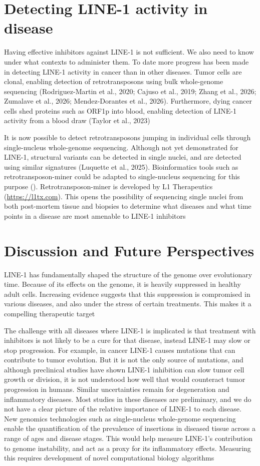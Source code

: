\documentclass[11pt,twocolumn,twoside]{extarticle}
\begin{document}
\section{Detecting LINE-1 activity in disease}
Having effective inhibitors against LINE-1 is not sufficient. We also need to know under what contexts to administer them. To date more progress has been made in detecting LINE-1 activity in cancer than in other diseases. Tumor cells are clonal, enabling detection of retrotransposons using bulk whole-genome sequencing (Rodriguez-Martin et al., 2020; Cajuso et al., 2019; Zhang et al., 2026; Zumalave et al., 2026; Mendez-Dorantes et al., 2026). Furthermore, dying cancer cells shed proteins such as ORF1p into blood, enabling detection of LINE-1 activity from a blood draw (Taylor et al., 2023)

It is now possible to detect retrotransposons jumping in individual cells through single-nucleus whole-genome sequencing. Although not yet demonstrated for LINE-1, structural variants can be detected in single nuclei, and are detected using similar signatures (Luquette et al., 2025). Bioinformatics tools such as retrotransposon-miner could be adapted to single-nucleus sequencing for this purpose (\href{https://github.com/L1-Therapeutics/retrotransposon-miner}{\faGithub}). Retrotransposon-miner is developed by L1 Therapeutics (\url{https://l1tx.com}). This opens the possibility of sequencing single nuclei from both post-mortem tissue and biopsies to determine what diseases and what time points in a disease are most amenable to LINE-1 inhibitors

\section{Discussion and Future Perspectives}
LINE-1 has fundamentally shaped the structure of the genome over evolutionary time. Because of its effects on the genome, it is heavily suppressed in healthy adult cells. Increasing evidence suggests that this suppression is compromised in various diseases, and also under the stress of certain treatments. This makes it a compelling therapeutic target

The challenge with all diseases where LINE-1 is implicated is that treatment with inhibitors is not likely to be a cure for that disease, instead LINE-1 may slow or stop progression. For example, in cancer LINE-1 causes mutations that can contribute to tumor evolution. But it is not the only source of mutations, and although preclinical studies have shown LINE-1 inhibition can slow tumor cell growth or division, it is not understood how well that would counteract tumor progression in humans. Similar uncertainties remain for degeneration and inflammatory diseases. Most studies in these diseases are preliminary, and we do not have a clear picture of the relative importance of LINE-1 to each disease. New genomics technologies such as single-nucleus whole-genome sequencing enable the quantification of the prevalence of insertions in diseased tissue across a range of ages and disease stages. This would help measure LINE-1's contribution to genome instability, and act as a proxy for its inflammatory effects. Measuring this requires development of novel computational biology algorithms
\end{document}
